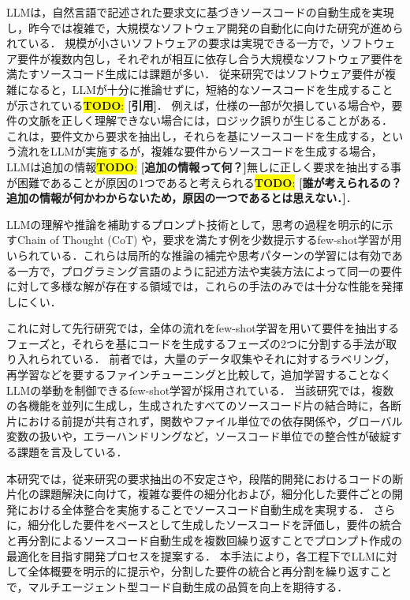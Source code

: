 \documentclass[submit,techrep,noauthor]{ipsj}
\newcommand{\todo}[1]{\colorbox{yellow}{{\bf TODO}:}{\color{red} {\textbf{[#1]}}}}
\begin{document}
LLMは，自然言語で記述された要求文に基づきソースコードの自動生成を実現し，昨今では複雑で，大規模なソフトウェア開発の自動化に向けた研究が進められている\cite{LLM_CodeGeneration}．
規模が小さいソフトウェアの要求は実現できる一方で，ソフトウェア要件が複数内包し，それぞれが相互に依存し合う大規模なソフトウェア要件を満たすソースコード生成には課題が多い．
従来研究ではソフトウェア要件が複雑になると，LLMが十分に推論せずに，短絡的なソースコードを生成することが示されている\todo{引用}．
例えば，仕様の一部が欠損している場合や，要件の文脈を正しく理解できない場合には，ロジック誤りが生じることがある．
これは，要件文から要求を抽出し，それらを基にソースコードを生成する，という流れをLLMが実施するが，複雑な要件からソースコードを生成する場合，LLMは追加の情報\todo{追加の情報って何？}無しに正しく要求を抽出する事が困難であることが原因の1つであると考えられる\todo{誰が考えられるの？追加の情報が何かわからないため，原因の一つであるとは思えない．}．

LLMの理解や推論を補助するプロンプト技術として，思考の過程を明示的に示すChain of Thought (CoT) や，要求を満たす例を少数提示するfew-shot学習が用いられている\cite{LLM_fewshot}．これらは局所的な推論の補完や思考パターンの学習には有効である一方で，プログラミング言語のように記述方法や実装方法によって同一の要件に対して多様な解が存在する領域では，これらの手法のみでは十分な性能を発揮しにくい．

これに対して先行研究では，全体の流れをfew-shot学習を用いて要件を抽出するフェーズと，それらを基にコードを生成するフェーズの2つに分割する手法が取り入れられている\cite{tosem}．
前者では，大量のデータ収集やそれに対するラベリング，再学習などを要するファインチューニングと比較して，追加学習することなくLLMの挙動を制御できるfew-shot学習が採用されている．
当該研究では，複数の各機能を並列に生成し，生成されたすべてのソースコード片の結合時に，各断片における前提が共有されず，関数やファイル単位での依存関係や，グローバル変数の扱いや，エラーハンドリングなど，ソースコード単位での整合性が破綻する課題を言及している．


本研究では，従来研究\cite{tosem}の要求抽出の不安定さや，段階的開発におけるコードの断片化の課題解決に向けて，複雑な要件の細分化および，細分化した要件ごとの開発における全体整合を実施することでソースコード自動生成を実現する．
さらに，細分化した要件をベースとして生成したソースコードを評価し，要件の統合と再分割によるソースコード自動生成を複数回繰り返すことでプロンプト作成の最適化を目指す開発プロセスを提案する．
本手法により，各工程下でLLMに対して全体概要を明示的に提示や，分割した要件の統合と再分割を繰り返すことで，マルチエージェント型コード自動生成の品質を向上を期待する．
\end{document}
